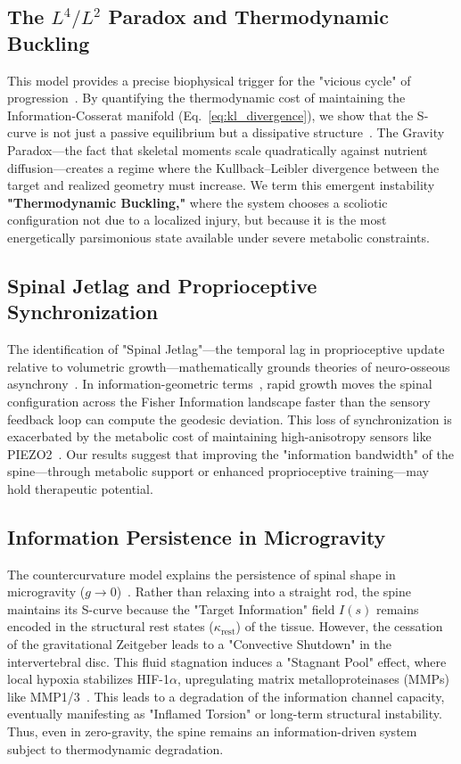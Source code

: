 \documentclass[11pt,a4paper]{article}
\begin{document}
\subsection{The $L^4 / L^2$ Paradox and Thermodynamic Buckling}
This model provides a precise biophysical trigger for the "vicious cycle" of progression~\cite{stokes2006hueter}. By quantifying the thermodynamic cost of maintaining the Information-Cosserat manifold (Eq.~\ref{eq:kl_divergence}), we show that the S-curve is not just a passive equilibrium but a dissipative structure~\cite{prigogine1977self}. The Gravity Paradox—the fact that skeletal moments scale quadratically against nutrient diffusion—creates a regime where the Kullback--Leibler divergence between the target and realized geometry must increase. We term this emergent instability \textbf{"Thermodynamic Buckling,"} where the system chooses a scoliotic configuration not due to a localized injury, but because it is the most energetically parsimonious state available under severe metabolic constraints.

\subsection{Spinal Jetlag and Proprioceptive Synchronization}
The identification of "Spinal Jetlag"—the temporal lag in proprioceptive update relative to volumetric growth—mathematically grounds theories of neuro-osseous asynchrony~\cite{burwell2009aetiopathogenesis}. In information-geometric terms~\cite{amari2016information}, rapid growth moves the spinal configuration across the Fisher Information landscape faster than the sensory feedback loop can compute the geodesic deviation. This loss of synchronization is exacerbated by the metabolic cost of maintaining high-anisotropy sensors like PIEZO2~\cite{wang2020piezo2}. Our results suggest that improving the "information bandwidth" of the spine—through metabolic support or enhanced proprioceptive training—may hold therapeutic potential.

\subsection{Information Persistence in Microgravity}
The countercurvature model explains the persistence of spinal shape in microgravity ($g \to 0$)~\cite{green2018spinal}. Rather than relaxing into a straight rod, the spine maintains its S-curve because the "Target Information" field $I(s)$ remains encoded in the structural rest states ($\kappa_{\mathrm{rest}}$) of the tissue. However, the cessation of the gravitational Zeitgeber leads to a "Convective Shutdown" in the intervertebral disc. This fluid stagnation induces a "Stagnant Pool" effect, where local hypoxia stabilizes HIF-1$\alpha$, upregulating matrix metalloproteinases (MMPs) like MMP1/3~\cite{chen2025mmp}. This leads to a degradation of the information channel capacity, eventually manifesting as "Inflamed Torsion" or long-term structural instability. Thus, even in zero-gravity, the spine remains an information-driven system subject to thermodynamic degradation.
\end{document}
